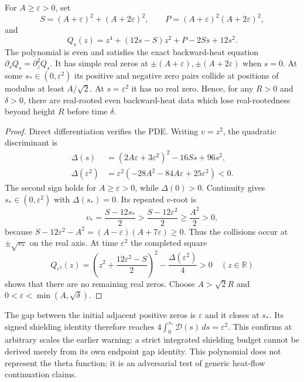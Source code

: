 \begin{theorem}\label{thm:even-high-collision}
For $A\ge\varepsilon>0$, set
\[
S=(A+\varepsilon)^2+(A+2\varepsilon)^2,\qquad
P=(A+\varepsilon)^2(A+2\varepsilon)^2,
\]
and
\begin{equation}
Q_s(z)=z^4+(12s-S)z^2+P-2Ss+12s^2.
\label{eq:height-renewal-quartic}
\end{equation}
The polynomial is even and satisfies the exact
backward-heat equation
$\partial_sQ_s=\partial_z^2Q_s$.
It has simple real zeros at
$\pm(A+\varepsilon),\pm(A+2\varepsilon)$
when $s=0$. At some
$s_*\in(0,\varepsilon^2)$ its positive
and negative zero pairs collide at positions
of modulus at least $A/\sqrt2$.
At $s=\varepsilon^2$ it has no real zero.
Hence, for any $R>0$ and $\delta>0$,
there are real-rooted even backward-heat data
which lose real-rootedness beyond height $R$
before time $\delta$.
\end{theorem}
\begin{proof}
Direct differentiation verifies the PDE.
Writing $v=z^2$, the quadratic discriminant is
\begin{align}
\Delta(s)&=(2A\varepsilon+3\varepsilon^2)^2
-16Ss+96s^2,\label{eq:height-renewal-discr}\\
\Delta(\varepsilon^2)&=\varepsilon^2
(-28A^2-84A\varepsilon+25\varepsilon^2)<0.
\end{align}
The second sign holds for $A\ge\varepsilon>0$,
while $\Delta(0)>0$.
Continuity gives $s_*\in(0,\varepsilon^2)$
with $\Delta(s_*)=0$. Its repeated $v$-root is
\[
v_*=\frac{S-12s_*}{2}>
\frac{S-12\varepsilon^2}{2}\ge\frac{A^2}{2}>0,
\]
because
$S-12\varepsilon^2-A^2
=(A-\varepsilon)(A+7\varepsilon)\ge0$.
Thus the collisions occur at
$\pm\sqrt{v_*}$ on the real axis.
At time $\varepsilon^2$ the completed square
\[
Q_{\varepsilon^2}(z)=
\left(z^2+\frac{12\varepsilon^2-S}{2}\right)^2
-\frac{\Delta(\varepsilon^2)}4>0
\quad(z\in\mathbb R)
\]
shows that there are no remaining real zeros.
Choose $A>\sqrt2R$ and
$0<\varepsilon<\min(A,\sqrt\delta)$.
\end{proof}

The gap between the initial adjacent positive
zeros is $\varepsilon$ and it closes at $s_*$.
Its signed shielding identity therefore reaches
$4\int_0^{s_*}\mathcal D(s)\,ds=\varepsilon^2$.
This confirms at arbitrary scales the earlier
warning: a strict integrated shielding budget
cannot be derived merely from its own endpoint
gap identity. This polynomial does not represent
the theta function; it is an adversarial test
of generic heat-flow continuation claims.


